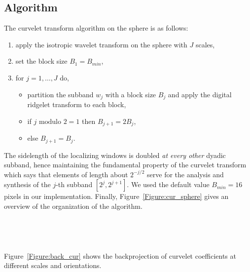 \subsection{Algorithm}
The curvelet transform algorithm on the sphere is as follows:
\begin{enumerate}
\item apply the isotropic wavelet transform on the sphere with $J$ scales,
\item set the block size $B_1 = B_{min}$,
\item for $j = 1, \ldots, J$ do,
\begin{itemize}
\item partition the subband $w_j$ with a block size $B_j$ and apply the digital ridgelet transform to each block,
\item if $j \mbox{ modulo } 2 = 1$ then $B_{j+1} = 2 B_{j}$,
\item else $B_{j+1} = B_{j}$.
\end{itemize}
\end{enumerate}
The sidelength of the localizing windows is doubled {\em at every other} dyadic subband, hence maintaining the fundamental property of
the curvelet transform which says that elements of length about $2^{-j/2}$ serve for the analysis and synthesis of the $j$-th subband
$[2^j, 2^{j+1}]$. We used the default value $B_{min} = 16$ pixels in our implementation. Finally, Figure~\ref{Figure:cur_sphere} gives 
an overview of the organization of the algorithm.
\begin{figure*}
\centerline{
\hbox{
}}
\caption{Flowgraph of the Curvelet Transform on the Sphere.}
\label{Figure:cur_sphere}
\end{figure*}
\begin{figure*}
\centerline{
\hbox{
}}
\caption{Backprojection of a curvelet coefficient at different scales and orientations.
{ Each map is obtained by setting all curvelet coefficients to zero but one, and applying an inverse curvelet transform. 
Depending on the scale and the position of the non zero curvelet coefficient, the reconstructed image presents a feature 
with a given width, length and orientation.}}
\label{Figure:back_cur}
\end{figure*}
Figure~\ref{Figure:back_cur} shows the backprojection of  curvelet coefficients at different scales and orientations.


